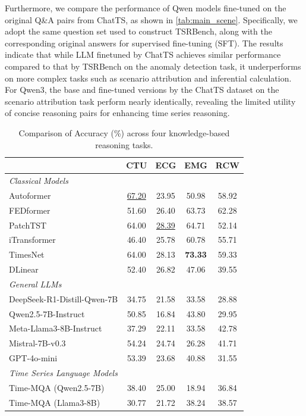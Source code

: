 \documentclass{article}
\theoremstyle{plain}
\theoremstyle{definition}
\theoremstyle{remark}
\begin{document}
Furthermore, we compare the performance of Qwen models fine-tuned on the original Q\&A pairs from ChatTS, as shown in \autoref{tab:main_scene}. Specifically, we adopt the same question set used to construct TSRBench, along with the corresponding original answers for supervised fine-tuning (SFT). The results indicate that while LLM finetuned by ChatTS achieves similar performance compared to that by TSRBench on the anomaly detection task, it underperforms on more complex tasks such as scenario attribution and inferential calculation. For Qwen3, the base and fine-tuned versions by the ChatTS dataset on the scenario attribution task perform nearly identically, revealing the limited utility of concise reasoning pairs for enhancing time series reasoning.
\begin{table}[htbp]
\vspace{-1em}
\centering
\caption{Comparison of Accuracy (\%) across four knowledge-based reasoning tasks.}
\vspace{-0.65em}
\scriptsize
\label{tab:main_classification}
\setlength{\tabcolsep}{2pt}
\begin{tabular}{lcccc}
\toprule
 & CTU & ECG & EMG & RCW \\
\midrule
\textit{Classical Models}  \\
Autoformer & \underline{67.20} & 23.95 & 50.98 & 58.92 \\
FEDformer & 51.60 & 26.40 & 63.73 & 62.28 \\
PatchTST & 64.00 & \underline{28.39} & 64.71 & 52.14 \\
iTransformer & 46.40 & 25.78 & 60.78 & 55.71 \\
TimesNet & 64.00 & 28.13 & \textbf{73.33} & 59.33 \\
DLinear & 52.40 & 26.82 & 47.06 & 39.55 \\
\midrule
\textit{General LLMs}  \\
DeepSeek-R1-Distill-Qwen-7B & 34.75 & 21.58 & 33.58 & 28.88 \\
Qwen2.5-7B-Instruct & 50.85 & 16.84 & 43.80 & 29.95\\
Meta-Llama3-8B-Instruct & 37.29 & 22.11 & 33.58 & 42.78 \\
Mistral-7B-v0.3 & 54.24 & 24.74 & 26.28 & 41.71 \\
GPT-4o-mini & 53.39 & 23.68 & 40.88 & 31.55 \\
\midrule
\textit{Time Series Language Models}  \\
Time-MQA (Qwen2.5-7B) & 38.40 & 25.00 & 18.94 & 36.84 \\
Time-MQA (Llama3-8B) & 30.77 & 21.72 & 38.24 & 38.57 \\

\end{tabular}
\end{table}
\end{document}
